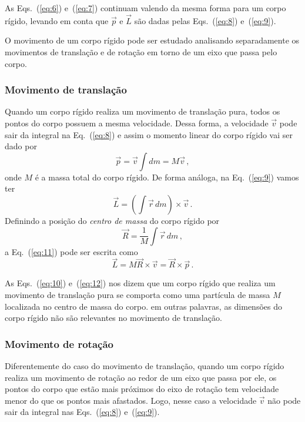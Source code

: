 \documentclass[twocolumn=on,DIV=calc]{scrartcl}
\newcommand{\dpar}[1]{\left(#1\right)}
\theoremstyle{definition}
\begin{document}
As Eqs.~(\ref{eq:6}) e~(\ref{eq:7}) continuam valendo da mesma
forma para um corpo rígido, levando em conta que $\vec p$ e $\vec L$
são dadas pelas Eqs.~(\ref{eq:8}) e~(\ref{eq:9}).

O movimento de um corpo rígido pode ser estudado analisando
separadamente os movimentos de translação e de rotação em torno de um
eixo que passa pelo corpo.

\subsubsection{Movimento de translação}
Quando um corpo rígido realiza um movimento de translação pura, todos
os pontos do corpo possuem a mesma velocidade. Dessa forma, a
velocidade $\vec v$ pode sair da integral na Eq.~(\ref{eq:8}) e assim o momento
linear do corpo rígido vai ser dado por
\begin{equation}
  \label{eq:10}
  \vec p=\vec v\int dm=M\vec v\,,
\end{equation}
onde $M$ é a massa total do corpo rígido. De forma análoga, na
Eq.~(\ref{eq:9}) vamos ter
\begin{equation}
  \label{eq:11}
  \vec L=\dpar{\int \vec r\,dm}\times\vec v\,.
\end{equation}
Definindo a posição do \textit{centro de massa} do corpo rígido por
$$\vec R=\frac{1}{M}\int \vec r\,dm\,,$$
a Eq.~(\ref{eq:11}) pode ser escrita como
\begin{equation}
  \label{eq:12}
  \vec L=M\vec R\times\vec v=\vec R\times\vec p\,.
\end{equation}

As Eqs.~(\ref{eq:10}) e~(\ref{eq:12}) nos dizem que um corpo rígido
que realiza um movimento de translação pura se comporta como uma
partícula de massa $M$ localizada no centro de massa do corpo. em
outras palavras, as dimensões do corpo rígido não são relevantes no
movimento de translação.

\subsubsection{Movimento de rotação}
Diferentemente do caso do movimento de translação, quando um corpo
rígido realiza um movimento de rotação ao redor de um eixo que passa
por ele, os pontos do corpo que estão mais próximos do eixo de rotação
tem velocidade menor do que os pontos mais afastados. Logo, nesse caso
a velocidade $\vec v$ não pode sair da integral nas Eqs.~(\ref{eq:8})
e~(\ref{eq:9}).
\end{document}
